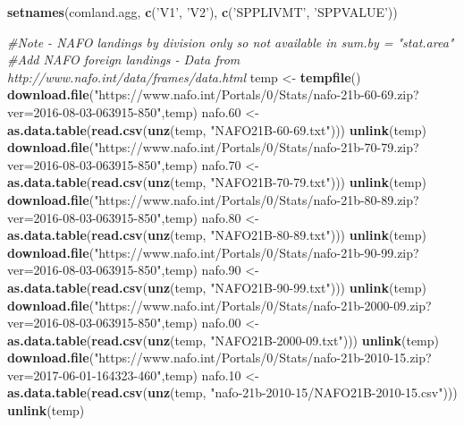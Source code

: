\documentclass[]{article}
\newenvironment{Shaded}{\begin{snugshade}}{\end{snugshade}}
\newcommand{\KeywordTok}[1]{\textcolor[rgb]{0.13,0.29,0.53}{\textbf{#1}}}
\newcommand{\DecValTok}[1]{\textcolor[rgb]{0.00,0.00,0.81}{#1}}
\newcommand{\StringTok}[1]{\textcolor[rgb]{0.31,0.60,0.02}{#1}}
\newcommand{\CommentTok}[1]{\textcolor[rgb]{0.56,0.35,0.01}{\textit{#1}}}
\newcommand{\NormalTok}[1]{#1}
\begin{document}
\begin{Shaded}
\begin{Highlighting}[]
{{{{{{  \KeywordTok{setnames}\NormalTok{(comland.agg, }\KeywordTok{c}\NormalTok{(}\StringTok{'V1'}\NormalTok{, }\StringTok{'V2'}\NormalTok{), }\KeywordTok{c}\NormalTok{(}\StringTok{'SPPLIVMT'}\NormalTok{, }\StringTok{'SPPVALUE'}\NormalTok{))}
  
  \CommentTok{#Note - NAFO landings by division only so not available in sum.by = "stat.area"}
  \CommentTok{#Add NAFO foreign landings - Data from http://www.nafo.int/data/frames/data.html}
\NormalTok{  temp <-}\StringTok{ }\KeywordTok{tempfile}\NormalTok{()}
  \KeywordTok{download.file}\NormalTok{(}\StringTok{"https://www.nafo.int/Portals/0/Stats/nafo-21b-60-69.zip?ver=2016-08-03-063915-850"}\NormalTok{,temp)}
\NormalTok{  nafo.}\DecValTok{60}\NormalTok{ <-}\StringTok{ }\KeywordTok{as.data.table}\NormalTok{(}\KeywordTok{read.csv}\NormalTok{(}\KeywordTok{unz}\NormalTok{(temp, }\StringTok{"NAFO21B-60-69.txt"}\NormalTok{)))}
  \KeywordTok{unlink}\NormalTok{(temp)}
  \KeywordTok{download.file}\NormalTok{(}\StringTok{"https://www.nafo.int/Portals/0/Stats/nafo-21b-70-79.zip?ver=2016-08-03-063915-850"}\NormalTok{,temp)}
\NormalTok{  nafo.}\DecValTok{70}\NormalTok{ <-}\StringTok{ }\KeywordTok{as.data.table}\NormalTok{(}\KeywordTok{read.csv}\NormalTok{(}\KeywordTok{unz}\NormalTok{(temp, }\StringTok{"NAFO21B-70-79.txt"}\NormalTok{)))}
  \KeywordTok{unlink}\NormalTok{(temp)}
  \KeywordTok{download.file}\NormalTok{(}\StringTok{"https://www.nafo.int/Portals/0/Stats/nafo-21b-80-89.zip?ver=2016-08-03-063915-850"}\NormalTok{,temp)}
\NormalTok{  nafo.}\DecValTok{80}\NormalTok{ <-}\StringTok{ }\KeywordTok{as.data.table}\NormalTok{(}\KeywordTok{read.csv}\NormalTok{(}\KeywordTok{unz}\NormalTok{(temp, }\StringTok{"NAFO21B-80-89.txt"}\NormalTok{)))}
  \KeywordTok{unlink}\NormalTok{(temp)}
  \KeywordTok{download.file}\NormalTok{(}\StringTok{"https://www.nafo.int/Portals/0/Stats/nafo-21b-90-99.zip?ver=2016-08-03-063915-850"}\NormalTok{,temp)}
\NormalTok{  nafo.}\DecValTok{90}\NormalTok{ <-}\StringTok{ }\KeywordTok{as.data.table}\NormalTok{(}\KeywordTok{read.csv}\NormalTok{(}\KeywordTok{unz}\NormalTok{(temp, }\StringTok{"NAFO21B-90-99.txt"}\NormalTok{)))}
  \KeywordTok{unlink}\NormalTok{(temp)}
  \KeywordTok{download.file}\NormalTok{(}\StringTok{"https://www.nafo.int/Portals/0/Stats/nafo-21b-2000-09.zip?ver=2016-08-03-063915-850"}\NormalTok{,temp)}
\NormalTok{  nafo.}\DecValTok{00}\NormalTok{ <-}\StringTok{ }\KeywordTok{as.data.table}\NormalTok{(}\KeywordTok{read.csv}\NormalTok{(}\KeywordTok{unz}\NormalTok{(temp, }\StringTok{"NAFO21B-2000-09.txt"}\NormalTok{)))}
  \KeywordTok{unlink}\NormalTok{(temp)}
  \KeywordTok{download.file}\NormalTok{(}\StringTok{"https://www.nafo.int/Portals/0/Stats/nafo-21b-2010-15.zip?ver=2017-06-01-164323-460"}\NormalTok{,temp)}
\NormalTok{  nafo.}\DecValTok{10}\NormalTok{ <-}\StringTok{ }\KeywordTok{as.data.table}\NormalTok{(}\KeywordTok{read.csv}\NormalTok{(}\KeywordTok{unz}\NormalTok{(temp, }\StringTok{"nafo-21b-2010-15/NAFO21B-2010-15.csv"}\NormalTok{)))}
  \KeywordTok{unlink}\NormalTok{(temp)}
  
}}}}}}
\end{Highlighting}
\end{Shaded}
\end{document}
